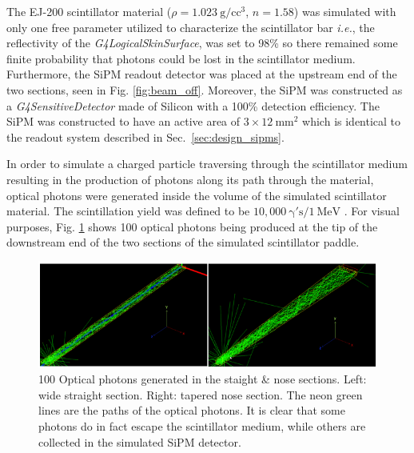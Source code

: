 The EJ-200 scintillator material ($\rho=1.023~\mathrm{g/cc^{3}}$, $n = 1.58$) \cite{ej200_specs} was simulated with only one free parameter utilized to characterize the scintillator bar \textit{i.e.}, the reflectivity of the \textit{G4LogicalSkinSurface}, was set to 98\% so there remained some finite probability that photons could be lost in the scintillator medium.  Furthermore, the SiPM readout detector was placed at the upstream end of the two sections, seen in Fig. \ref{fig:beam_off}.  Moreover, the SiPM was constructed as a \textit{G4SensitiveDetector} made of Silicon with a 100\% detection efficiency.  The SiPM was constructed to have an active area of $\mathrm{3 \times 12~mm^2}$ which is identical to the readout system described in Sec.~\ref{sec:design_sipms}.

In order to simulate a charged particle traversing through the scintillator medium resulting in the production of photons along its path through the material, optical photons were generated inside the volume of the simulated scintillator material.  The scintillation yield was defined to be $\mathrm{10,000~ \gamma 's / 1~MeV}$ \cite{ej200_specs}. For visual purposes, Fig. \ref{fig:100_events} shows 100 optical photons being produced at the tip of the downstream end of the two sections of the simulated scintillator paddle.
	\begin{figure}[!htb]
	\centering
	\includegraphics[width=1.0\columnwidth]{simulation/figs/100_events}
	\caption{100 Optical photons generated in the staight \& nose sections.  Left: wide straight section.  Right: tapered nose section.  The neon green lines are the paths of the optical photons.  It is clear that some photons do in fact escape the scintillator medium, while others are collected in the simulated SiPM detector.}
	\label{fig:100_events}
	\end{figure}

